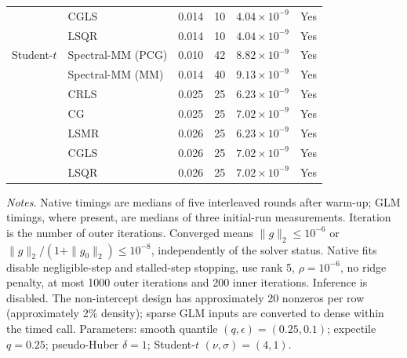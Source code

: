 \documentclass[10pt,a4paper]{article}
\begin{document}
\begin{longtable}{llrrrc}
 & CGLS & 0.014 & 10 & $4.04\times10^{-9}$ & Yes \\
 & LSQR & 0.014 & 10 & $4.04\times10^{-9}$ & Yes \\
\midrule
Student-$t$ & Spectral-MM (PCG) & 0.010 & 42 & $8.82\times10^{-9}$ & Yes \\
 & Spectral-MM (MM) & 0.014 & 40 & $9.13\times10^{-9}$ & Yes \\
 & CRLS & 0.025 & 25 & $6.23\times10^{-9}$ & Yes \\
 & CG & 0.025 & 25 & $7.02\times10^{-9}$ & Yes \\
 & LSMR & 0.026 & 25 & $6.23\times10^{-9}$ & Yes \\
 & CGLS & 0.026 & 25 & $7.02\times10^{-9}$ & Yes \\
 & LSQR & 0.026 & 25 & $7.02\times10^{-9}$ & Yes \\
\end{longtable}
\noindent\textit{Notes.} Native timings are medians of five interleaved rounds after warm-up; GLM timings, where present, are medians of three initial-run measurements. Iteration is the number of outer iterations. Converged means $\|g\|_2\leq10^{-6}$ or $\|g\|_2/(1+\|g_0\|_2)\leq10^{-8}$, independently of the solver status. Native fits disable negligible-step and stalled-step stopping, use rank 5, $\rho=10^{-6}$, no ridge penalty, at most 1000 outer iterations and 200 inner iterations. Inference is disabled.
The non-intercept design has approximately 20 nonzeros per row (approximately 2\% density); sparse GLM inputs are converted to dense within the timed call.
Parameters: smooth quantile $(q,\epsilon)=(0.25,0.1)$; expectile $q=0.25$; pseudo-Huber $\delta=1$; Student-$t$ $(\nu,\sigma)=(4,1)$.
\par
\endgroup
\end{document}
